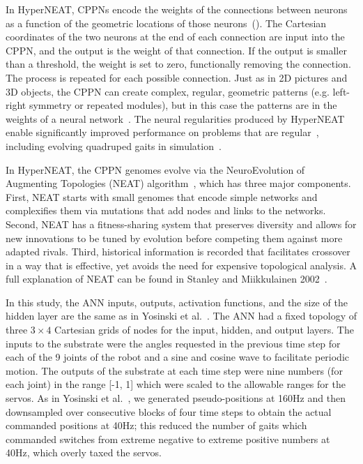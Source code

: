 In HyperNEAT, CPPNs encode the weights of the connections between neurons as a function of the geometric locations of those neurons~(). The Cartesian coordinates of the two neurons at the end of each connection are input into the CPPN, and the output is the weight of that connection. If the output is smaller than a threshold, the weight is set to zero, functionally removing the connection. The process is repeated for each possible connection. Just as in 2D pictures and 3D objects, the CPPN can create complex, regular, geometric patterns (e.g. left-right symmetry or repeated modules), but in this case the patterns are in the weights of a neural network~\cite{clune2011performance}. The neural regularities produced by HyperNEAT enable significantly improved performance on problems that are regular~\cite{clune2011performance,stanley2009hypercube}, including evolving quadruped gaits in simulation~\cite{clune2011performance,clune2009evolving,clune2009sensitivity}. 

In HyperNEAT, the CPPN genomes evolve via the NeuroEvolution of Augmenting Topologies (NEAT) algorithm~\cite{stanley2002evolving}, which has three major components. 
First, NEAT starts with small genomes that encode simple networks and complexifies them via mutations that add nodes and links to the networks. Second, NEAT has a fitness-sharing system that preserves diversity and allows for new innovations to be tuned by evolution before competing them against more adapted rivals. 
Third, historical information is recorded that facilitates crossover in a way that is effective, yet avoids the need for expensive topological analysis. A full explanation of NEAT can be found in Stanley and Miikkulainen 2002~\cite{stanley2002evolving}. 

In this study, the ANN inputs, outputs, activation functions, and the size of the hidden layer are the same as in Yosinski et al.~\cite{yos:clune}. 
The ANN had a fixed topology of three \begin{math}3\times4\end{math} Cartesian grids of nodes for the input, hidden, and output layers. 
The inputs to the substrate were the angles requested in the previous time step for each of the 9 joints of the robot and a sine and cosine wave to facilitate periodic motion. 
The outputs of the substrate at each time step were nine numbers (for each joint) in the range [-1, 1] which were scaled to the allowable ranges for the servos. 
As in Yosinski et al.~\cite{yos:clune}, we generated pseudo-positions at 160Hz and then downsampled over consecutive blocks of four time steps to obtain the actual commanded positions at 40Hz; this reduced the number of gaits which commanded switches from extreme negative to extreme positive numbers at 40Hz, which overly taxed the servos.



